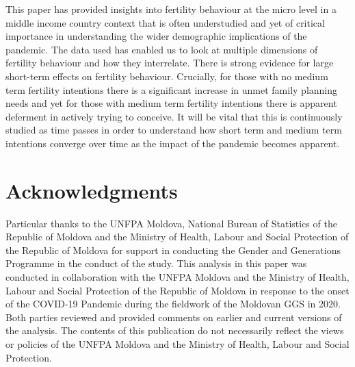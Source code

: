 \documentclass[10pt,letterpaper]{article}
\begin{document}
This paper has provided insights into fertility behaviour at the micro level in a middle income country context that is often understudied and yet of critical importance in understanding the wider demographic implications of the pandemic. The data used has enabled us to look at multiple dimensions of fertility behaviour and how they interrelate. There is strong evidence for large short-term effects on fertility behaviour. Crucially, for those with no medium term fertility intentions there is a significant increase in unmet family planning needs and yet for those with medium term fertility intentions there is apparent deferment in actively trying to conceive. It will be vital that this is continuously studied as time passes in order to understand how short term and medium term intentions converge over time as the impact of the pandemic becomes apparent. 

\section*{Acknowledgments}
Particular thanks to the UNFPA Moldova, National Bureau of Statistics of the Republic of Moldova and the Ministry of Health, Labour and Social Protection of the Republic of Moldova for support in conducting the Gender and Generations Programme in the conduct of the study. This analysis in this paper was conducted in collaboration with the UNFPA Moldova and the Ministry of Health, Labour and Social Protection of the Republic of Moldova in response to the onset of the COVID-19 Pandemic during the fieldwork of the Moldovan GGS in 2020. Both parties reviewed and provided comments on earlier and current versions of the analysis. The contents of this publication do not necessarily reflect the views or policies of the UNFPA Moldova and the Ministry of Health, Labour and Social Protection.

\nolinenumbers

%
%
% 

\end{document}
